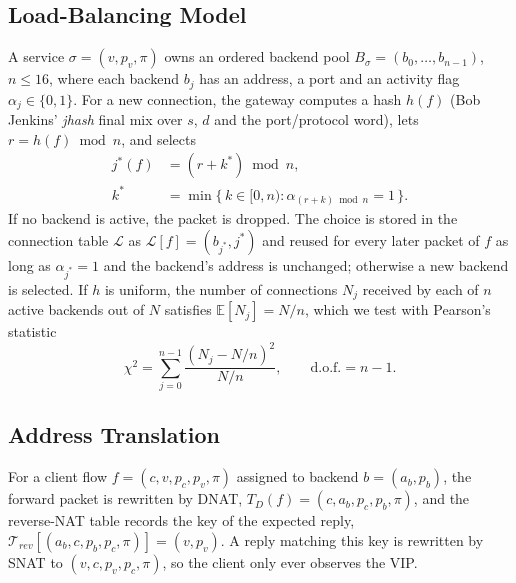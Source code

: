 \documentclass[conference]{IEEEtran}
\begin{document}
\subsection{Load-Balancing Model}
A service $\sigma=(v,p_v,\pi)$ owns an ordered backend pool
$B_\sigma=(b_0,\dots,b_{n-1})$, $n \le 16$, where each backend $b_j$ has an
address, a port and an activity flag $\alpha_j\in\{0,1\}$. For a new
connection, the gateway computes a hash $h(f)$ (Bob Jenkins' \textit{jhash}
final mix over $s$, $d$ and the port/protocol word), lets
$r = h(f) \bmod n$, and selects
\begin{equation}
\begin{aligned}
j^*(f) &= (r + k^*) \bmod n, \\
k^* &= \min\{\, k \in [0,n) : \alpha_{(r + k) \bmod n} = 1 \,\}.
\end{aligned}
\label{eq:select}
\end{equation}
If no backend is active, the packet is dropped. The choice is stored in the
connection table $\mathcal{L}$ as $\mathcal{L}[f]=(b_{j^*}, j^*)$ and reused
for every later packet of $f$ as long as $\alpha_{j^*}=1$ and the backend's
address is unchanged; otherwise a new backend is selected. If $h$ is uniform,
the number of connections $N_j$ received by each of $n$ active backends out of
$N$ satisfies $\mathbb{E}[N_j]=N/n$, which we test with Pearson's statistic
\begin{equation}
\chi^2 = \sum_{j=0}^{n-1} \frac{(N_j - N/n)^2}{N/n}, \qquad
\text{d.o.f.} = n-1.
\label{eq:chi2}
\end{equation}

\subsection{Address Translation}
For a client flow $f=(c,v,p_c,p_v,\pi)$ assigned to backend $b=(a_b,p_b)$, the
forward packet is rewritten by DNAT,
$T_D(f)=(c,a_b,p_c,p_b,\pi)$, and the reverse-NAT table records the key of
the expected reply, $\mathcal{T}_{rev}[(a_b,c,p_b,p_c,\pi)] = (v,p_v)$. A reply
matching this key is rewritten by SNAT to $(v,c,p_v,p_c,\pi)$, so the client
only ever observes the VIP.
\end{document}
